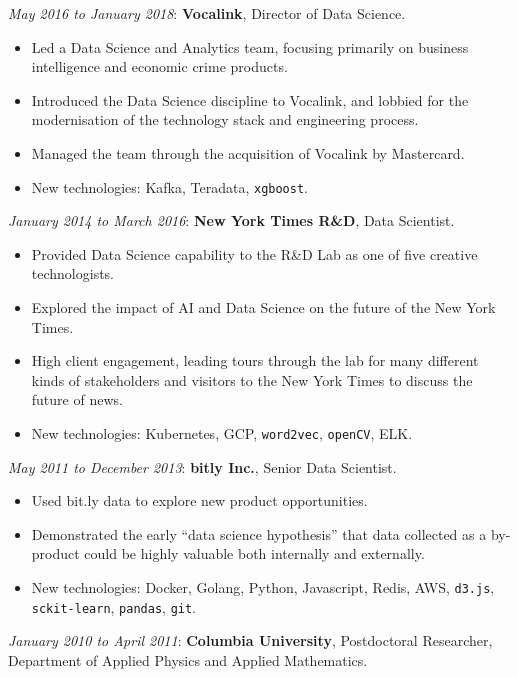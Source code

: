 \documentclass[line, overlapped]{res}
\providecommand{\tightlist}{%
  \setlength{\itemsep}{0pt}\setlength{\parskip}{0pt}}
\begin{document}
\begin{resume}
  \emph{May 2016 to January 2018}: \textbf{Vocalink}, Director of Data Science.
  \begin{itemize}
  \tightlist
	\item Led a Data Science and Analytics team, focusing primarily on business intelligence and economic crime products. 
	\item Introduced the Data Science discipline to Vocalink, and lobbied for the modernisation of the technology stack and engineering process.
	\item Managed the team through the acquisition of Vocalink by Mastercard.
	\item New technologies: Kafka, Teradata, \texttt{xgboost}.
  \end{itemize}

  \emph{January 2014 to March 2016}: \textbf{New York Times R\&D}, Data
  Scientist.
  \begin{itemize}
  \tightlist
	  \item Provided Data Science capability to the R\&D Lab as one of five creative technologists. 
	\item Explored the impact of AI and Data Science on the future of the New York Times.
	\item High client engagement, leading tours through the lab for many different kinds of stakeholders and visitors to the New York Times to discuss the future of news.
	\item New technologies: Kubernetes, GCP, \texttt{word2vec}, \texttt{openCV}, ELK.
  \end{itemize}

  \emph{May 2011 to December 2013}: \textbf{bitly Inc.}, Senior Data Scientist.
  \begin{itemize}
  \tightlist
	\item Used bit.ly data to explore new product opportunities.
	\item Demonstrated the early ``data science hypothesis'' that data collected as a by-product could be highly valuable both internally and externally.
	\item New technologies: Docker, Golang, Python, Javascript, Redis, AWS, \texttt{d3.js}, \texttt{sckit-learn}, \texttt{pandas}, \texttt{git}.
  \end{itemize}

\newpage

  \emph{January 2010 to April 2011}: \textbf{Columbia University},
  Postdoctoral Researcher, Department of Applied Physics and Applied
  Mathematics.


\end{resume}
\end{document}
